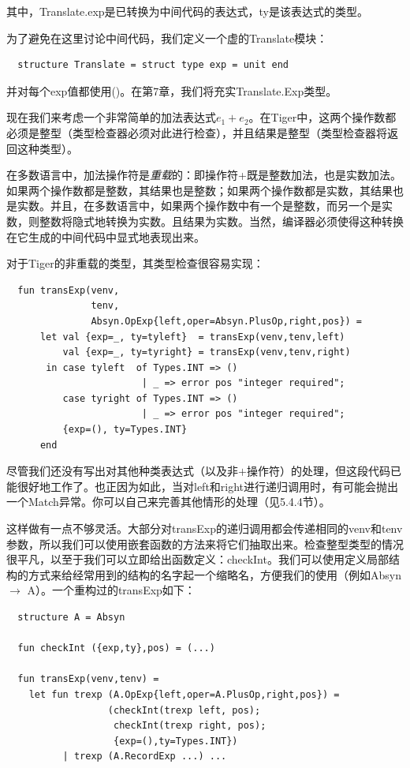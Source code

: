 \documentclass[cn,11pt,chinese]{elegantbook}
\begin{document}
其中，Translate.exp是已转换为中间代码的表达式，ty是该表达式的类型。

为了避免在这里讨论中间代码，我们定义一个虚的Translate模块：

\begin{lstlisting}
  structure Translate = struct type exp = unit end
\end{lstlisting}

并对每个exp值都使用()。在第7章，我们将充实Translate.Exp类型。

现在我们来考虑一个非常简单的加法表达式$e_1+e_2$。在Tiger中，这两个操作数都必须是整型（类型检查器必须对此进行检查），并且结果是整型（类型检查器将返回这种类型）。

在多数语言中，加法操作符是\textit{重载}的：即操作符+既是整数加法，也是实数加法。如果两个操作数都是整数，其结果也是整数；如果两个操作数都是实数，其结果也是实数。并且，在多数语言中，如果两个操作数中有一个是整数，而另一个是实数，则整数将隐式地转换为实数。且结果为实数。当然，编译器必须使得这种转换在它生成的中间代码中显式地表现出来。

对于Tiger的非重载的类型，其类型检查很容易实现：

\begin{lstlisting}
  fun transExp(venv,
               tenv,
               Absyn.OpExp{left,oper=Absyn.PlusOp,right,pos}) =
      let val {exp=_, ty=tyleft}  = transExp(venv,tenv,left)
          val {exp=_, ty=tyright} = transExp(venv,tenv,right)
       in case tyleft  of Types.INT => ()
                        | _ => error pos "integer required";
          case tyright of Types.INT => ()
                        | _ => error pos "integer required";
          {exp=(), ty=Types.INT}
      end
\end{lstlisting}

尽管我们还没有写出对其他种类表达式（以及非$+$操作符）的处理，但这段代码已能很好地工作了。也正因为如此，当对left和right进行递归调用时，有可能会抛出一个Match异常。你可以自己来完善其他情形的处理（见5.4.4节）。

这样做有一点不够灵活。大部分对transExp的递归调用都会传递相同的venv和tenv参数，所以我们可以使用嵌套函数的方法来将它们抽取出来。检查整型类型的情况很平凡，以至于我们可以立即给出函数定义：checkInt。我们可以使用定义局部结构的方式来给经常用到的结构的名字起一个缩略名，方便我们的使用（例如Absyn $\rightarrow$ A）。一个重构过的transExp如下：

\begin{lstlisting}
  structure A = Absyn

  fun checkInt ({exp,ty},pos) = (...)

  fun transExp(venv,tenv) =
    let fun trexp (A.OpExp{left,oper=A.PlusOp,right,pos}) =
                  (checkInt(trexp left, pos);
                   checkInt(trexp right, pos);
                   {exp=(),ty=Types.INT})
          | trexp (A.RecordExp ...) ...
\end{lstlisting}
\end{document}
